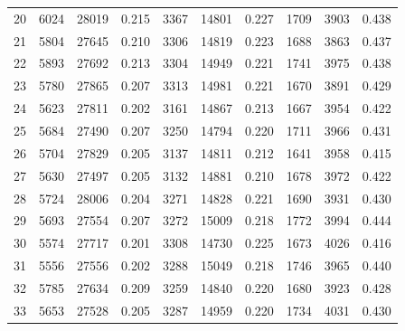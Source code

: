 \begin{table}
\begin{tabular}{c|C{1cm}C{1cm}C{1cm}|C{1cm}C{1cm}C{1cm}|C{1cm}C{1cm}C{1cm}}
20 & 6024 & 28019 & 0.215 & 3367 & 14801 & 0.227 & 1709 & 3903 & 0.438 \\
21 & 5804 & 27645 & 0.210 & 3306 & 14819 & 0.223 & 1688 & 3863 & 0.437 \\
22 & 5893 & 27692 & 0.213 & 3304 & 14949 & 0.221 & 1741 & 3975 & 0.438 \\
23 & 5780 & 27865 & 0.207 & 3313 & 14981 & 0.221 & 1670 & 3891 & 0.429 \\
24 & 5623 & 27811 & 0.202 & 3161 & 14867 & 0.213 & 1667 & 3954 & 0.422 \\
25 & 5684 & 27490 & 0.207 & 3250 & 14794 & 0.220 & 1711 & 3966 & 0.431 \\
26 & 5704 & 27829 & 0.205 & 3137 & 14811 & 0.212 & 1641 & 3958 & 0.415 \\
27 & 5630 & 27497 & 0.205 & 3132 & 14881 & 0.210 & 1678 & 3972 & 0.422 \\
28 & 5724 & 28006 & 0.204 & 3271 & 14828 & 0.221 & 1690 & 3931 & 0.430 \\
29 & 5693 & 27554 & 0.207 & 3272 & 15009 & 0.218 & 1772 & 3994 & 0.444 \\
30 & 5574 & 27717 & 0.201 & 3308 & 14730 & 0.225 & 1673 & 4026 & 0.416 \\
31 & 5556 & 27556 & 0.202 & 3288 & 15049 & 0.218 & 1746 & 3965 & 0.440 \\
32 & 5785 & 27634 & 0.209 & 3259 & 14840 & 0.220 & 1680 & 3923 & 0.428 \\
33 & 5653 & 27528 & 0.205 & 3287 & 14959 & 0.220 & 1734 & 4031 & 0.430 \\

\end{tabular}
\end{table}
